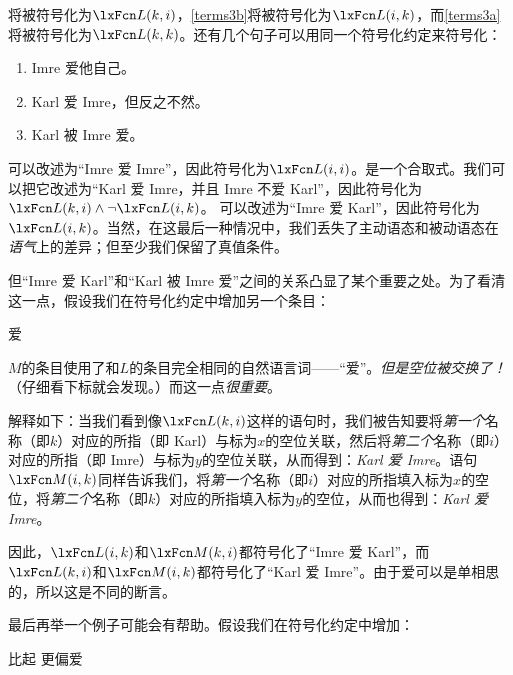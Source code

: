 将被符号化为$\atom{L}{k,i}$，\cref*{terms3b}将被符号化为$\atom{L}{i,k}$，而\cref*{terms3a}将被符号化为$\atom{L}{k,k}$。还有几个句子可以用同一个符号化约定来符号化：

\begin{enumerate}
	\item\label{terms4} Imre 爱他自己。
	\item\label{terms5} Karl 爱 Imre，但反之不然。
	\item\label{terms6} Karl 被 Imre 爱。
\end{enumerate}

可以改述为“Imre 爱 Imre”，因此符号化为$\atom{L}{i,i}$。是一个合取式。我们可以把它改述为“Karl 爱 Imre，并且 Imre 不爱 Karl”，因此符号化为$\atom{L}{k,i} \eand \enot \atom{L}{i,k}$。
可以改述为“Imre 爱 Karl”，因此符号化为$\atom{L}{i,k}$。当然，在这最后一种情况中，我们丢失了主动语态和被动语态在\emph{语气}上的差异；但至少我们保留了真值条件。

但“Imre 爱 Karl”和“Karl 被 Imre 爱”之间的关系凸显了某个重要之处。为了看清这一点，假设我们在符号化约定中增加另一个条目：

\begin{ekey}
	\item[\atom{M}{x,y}]  爱 
\end{ekey}

$M$的条目使用了和$L$的条目完全相同的自然语言词——“爱”。\emph{但是空位被交换了！}（仔细看下标就会发现。）而这一点\emph{很重要}。

解释如下：当我们看到像$\atom{L}{k,i}$这样的语句时，我们被告知要将\emph{第一个}名称（即$k$）对应的所指（即 Karl）与标为$x$的空位关联，然后将\emph{第二个}名称（即$i$）对应的所指（即 Imre）与标为$y$的空位关联，从而得到：\emph{Karl 爱 Imre}。语句$\atom{M}{i,k}$同样告诉我们，将\emph{第一个}名称（即$i$）对应的所指填入标为$x$的空位，将\emph{第二个}名称（即$k$）对应的所指填入标为$y$的空位，从而也得到：\emph{Karl 爱 Imre}。

因此，$\atom{L}{i,k}$和$\atom{M}{k,i}$都符号化了“Imre 爱 Karl”，而$\atom{L}{k,i}$和$\atom{M}{i,k}$都符号化了“Karl 爱 Imre”。由于爱可以是单相思的，所以这是不同的断言。

最后再举一个例子可能会有帮助。假设我们在符号化约定中增加：

\begin{ekey}
	\item[\atom{P}{x,y}]  比起  更偏爱 
\end{ekey}

